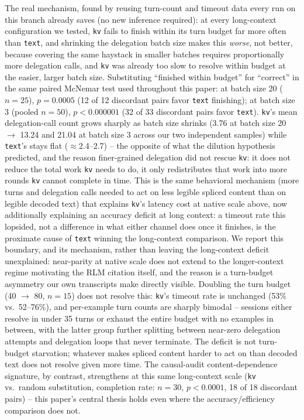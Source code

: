 \documentclass[11pt]{article}
\begin{document}
The real mechanism, found by reusing turn-count and timeout data every
run on this branch already saves (no new inference required): at every
long-context configuration we tested, \texttt{kv} fails to finish within
its turn budget far more often than \texttt{text}, and shrinking the
delegation batch size makes this \emph{worse}, not better, because
covering the same haystack in smaller batches requires proportionally
more delegation calls, and \texttt{kv} was already too slow to resolve
within budget at the easier, larger batch size. Substituting ``finished
within budget'' for ``correct'' in the same paired McNemar test used
throughout this paper: at batch size 20 ($n=25$), $p=0.0005$ (12 of 12
discordant pairs favor \texttt{text} finishing); at batch size 3 (pooled
$n=50$), $p<0.000001$ (32 of 33 discordant pairs favor \texttt{text}).
\texttt{kv}'s mean delegation-call count grows sharply as batch size
shrinks (3.76 at batch size 20 $\to$ 13.24 and 21.04 at batch size 3
across our two independent samples) while \texttt{text}'s stays flat
($\approx$2.4--2.7) --
the opposite of what the dilution hypothesis predicted, and the reason
finer-grained delegation did not rescue \texttt{kv}: it does not reduce
the total work \texttt{kv} needs to do, it only redistributes that work
into more rounds \texttt{kv} cannot complete in time. This is the same
behavioral mechanism (more turns and delegation calls needed to act on
less legible spliced content than on legible decoded text) that explains
\texttt{kv}'s latency cost at native scale above, now additionally
explaining an accuracy deficit at long context: a timeout rate this
lopsided, not a difference in what either channel does once it finishes,
is the proximate cause of \texttt{text} winning the long-context
comparison. We report this boundary, and its mechanism, rather than
leaving the long-context deficit unexplained: near-parity at native
scale does not extend to the longer-context regime motivating the RLM
citation itself, and the reason is a turn-budget asymmetry our own
transcripts make directly visible. Doubling the turn budget (40
$\to$ 80, $n=15$) does not resolve this: \texttt{kv}'s timeout rate is
unchanged (53\% vs.\ 52--76\%), and per-example turn counts are sharply
bimodal -- sessions either resolve in under 35 turns or exhaust the
entire budget with no examples in between, with the latter group
further splitting between near-zero delegation attempts and delegation
loops that never terminate. The deficit is not turn-budget starvation;
whatever makes spliced content harder to act on than decoded text does
not resolve given more time. The causal-audit content-dependence
signature, by contrast, strengthens at this same long-context scale
(\texttt{kv} vs.\ random substitution, completion rate: $n=30$,
$p<0.0001$, 18 of 18 discordant pairs) -- this paper's central thesis
holds even where the accuracy/efficiency comparison does not.
\end{document}
